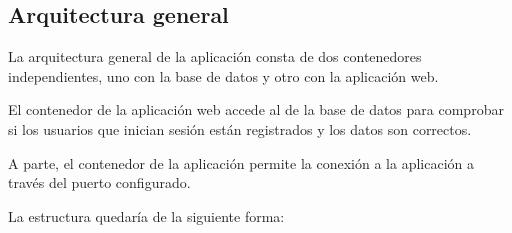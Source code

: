 \subsection{Arquitectura general}

La arquitectura general de la aplicación consta de dos contenedores independientes, uno con la base de datos y otro con la aplicación web.

El contenedor de la aplicación web accede al de la base de datos para comprobar si los usuarios que inician sesión están registrados y los datos son correctos.

A parte, el contenedor de la aplicación permite la conexión a la aplicación a través del puerto configurado.

La estructura quedaría de la siguiente forma:


